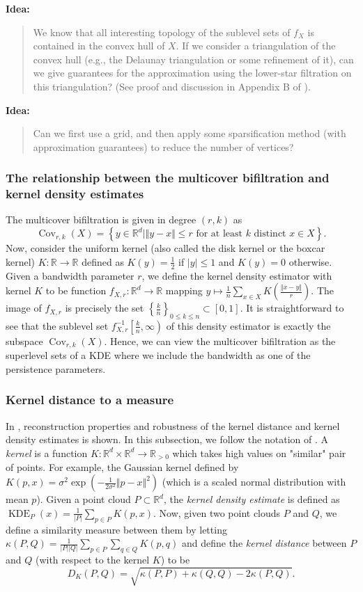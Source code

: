 \documentclass[10pt,a4paper]{article}
\theoremstyle{definition}
\newcommand{\posreals}{\ensuremath{\mathbb{R}_{>0}}}
\newcommand{\R}{\mathbb{R}}
\newenvironment{idea}{%
	\begin{tcolorbox}[colback=green, breakable, sharp corners]
		\textbf{Idea: }
		\medskip
		\begin{quote}
			\centering
}{\end{quote}\medskip\end{tcolorbox}}
\begin{document}
\begin{idea}
	We know that all interesting topology of the sublevel sets of $f_X$ is contained in the convex hull of $X$. If we consider a triangulation of the convex hull (e.g., the Delaunay triangulation or some refinement of it), can we give guarantees for the approximation using the lower-star filtration on this triangulation? (See proof and discussion in Appendix B of \autocite{Hoefgeest2022}).
\end{idea}

\begin{idea}
	Can we first use a grid, and then apply some sparsification method (with approximation guarantees) to reduce the number of vertices?
\end{idea}

\subsubsection{The relationship between the multicover bifiltration and kernel density estimates}

The multicover bifiltration is given in degree $(r,k)$ as
$$
\operatorname{Cov}_{r,k}(X) = \left\{y\in\R^d\mid\Vert y-x\Vert\leq r\text{ for at least $k$ distinct $x\in X$}\right\}.
$$
Now, consider the uniform kernel (also called the disk kernel or the boxcar kernel) $K\colon\R\to\R$ defined as $K(y)=\frac{1}{2}$ if $\vert y\vert\leq1$ and $K(y)=0$ otherwise. Given a bandwidth parameter $r$, we define the kernel density estimator with kernel $K$ to be function $f_{X,r}\colon\R^d\to\R$ mapping $y\mapsto\frac{1}{n}\sum_{x\in X}K\left(\frac{\Vert x-y\Vert}{r}\right)$. The image of $f_{X,r}$ is precisely the set $\left\{\frac{k}{n}\right\}_{0\leq k\leq n}\subset[0,1]$. It is straightforward to see that the sublevel set $f_{X,r}^{-1}\left[\frac{k}{n},\infty\right)$ of this density estimator is exactly the subspace $\operatorname{Cov}_{r,k}(X)$. Hence, we can view the multicover bifiltration as the superlevel sets of a KDE where we include the bandwidth as one of the persistence parameters.

\subsubsection{Kernel distance to a measure}
In \autocite{Phillips2013}, reconstruction properties and robustness of the kernel distance and kernel density estimates is shown. In this subsection, we follow the notation of \autocite{Phillips2013}. A \textit{kernel} is a function $K\colon\R^d\times\R^d\to\posreals$ which takes high values on "similar" pair of points. For example, the Gaussian kernel defined by $K(p,x)=\sigma^2\exp(-\frac{1}{2\sigma^2}\Vert p-x\Vert^2)$ (which is a scaled normal distribution with mean $p$). Given a point cloud $P\subset\R^d$, the \textit{kernel density estimate} is defined as $\operatorname{KDE}_P(x) = \frac{1}{|P|}\sum_{p\in P}K(p,x)$. Now, given two point clouds $P$ and $Q$, we define a similarity measure between them by letting $\kappa(P,Q)=\frac{1}{|P| |Q|}\sum_{p\in P}\sum_{q\in Q}K(p,q)$ and define the \textit{kernel distance} between $P$ and $Q$ (with respect to the kernel $K$) to be 
$$
D_K(P,Q) = \sqrt{\kappa(P,P)+\kappa(Q,Q)-2\kappa(P,Q)}.
$$
\end{document}
